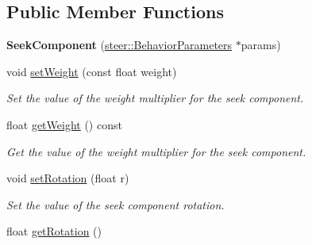 \subsection*{Public Member Functions}
\begin{DoxyCompactItemize}
\item 
\hypertarget{classsteer_1_1_seek_component_af7664e661c7ac568ca0ee97a84fcdd84}{{\bfseries Seek\-Component} (\hyperlink{structsteer_1_1_behavior_parameters}{steer\-::\-Behavior\-Parameters} $\ast$params)}\label{classsteer_1_1_seek_component_af7664e661c7ac568ca0ee97a84fcdd84}

\item 
void \hyperlink{classsteer_1_1_seek_component_ab581d425507b79abf04b227528f31f14}{set\-Weight} (const float weight)
\begin{DoxyCompactList}\small\item\em Set the value of the weight multiplier for the seek component. \end{DoxyCompactList}\item 
\hypertarget{classsteer_1_1_seek_component_a67c969244ed054dfb5a6abab6711b052}{float \hyperlink{classsteer_1_1_seek_component_a67c969244ed054dfb5a6abab6711b052}{get\-Weight} () const }\label{classsteer_1_1_seek_component_a67c969244ed054dfb5a6abab6711b052}

\begin{DoxyCompactList}\small\item\em Get the value of the weight multiplier for the seek component. \end{DoxyCompactList}\item 
\hypertarget{classsteer_1_1_seek_component_a7ecf69c4146448c36d626b89c430eaff}{void \hyperlink{classsteer_1_1_seek_component_a7ecf69c4146448c36d626b89c430eaff}{set\-Rotation} (float r)}\label{classsteer_1_1_seek_component_a7ecf69c4146448c36d626b89c430eaff}

\begin{DoxyCompactList}\small\item\em Set the value of the seek component rotation. \end{DoxyCompactList}\item 
\hypertarget{classsteer_1_1_seek_component_a391b89cc1e8d54061f81dca5ab852c89}{float \hyperlink{classsteer_1_1_seek_component_a391b89cc1e8d54061f81dca5ab852c89}{get\-Rotation} ()}\label{classsteer_1_1_seek_component_a391b89cc1e8d54061f81dca5ab852c89}


\end{DoxyCompactItemize}
